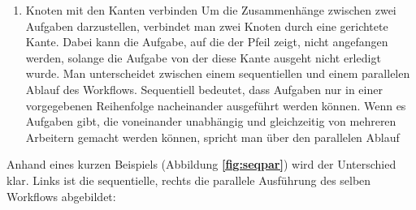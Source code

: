 \begin{enumerate}[font={\bfseries}, label={FA\arabic*}0, wide=0pt, labelindent=1em, leftmargin=*]
            \item  \label{kVerbinden:1} Knoten mit den Kanten verbinden \newline
            Um die Zusammenhänge zwischen zwei Aufgaben darzustellen, verbindet man zwei Knoten durch eine gerichtete Kante. Dabei kann die Aufgabe, auf die der Pfeil zeigt, nicht angefangen werden, solange die Aufgabe von der diese Kante ausgeht nicht erledigt wurde. \newline
            Man unterscheidet zwischen einem sequentiellen und einem parallelen Ablauf des Workflows.\newline
            Sequentiell bedeutet, dass Aufgaben nur in einer vorgegebenen Reihenfolge nacheinander ausgeführt werden können. Wenn es Aufgaben gibt, die voneinander unabhängig und gleichzeitig von mehreren Arbeitern gemacht werden können, spricht man über den parallelen Ablauf \newline
            
            \end{enumerate}
            
            \noindent Anhand eines kurzen Beispiels (Abbildung \textbf{\ref{fig:seqpar}}) wird der Unterschied klar. \newline
            Links ist die sequentielle, rechts die parallele Ausführung des selben Workflows abgebildet:
            
